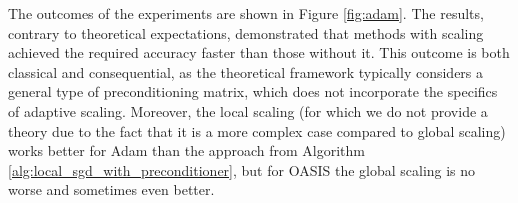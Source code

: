 \documentclass[sn-mathphys,Numbered]{sn-jnl}%
\renewcommand{\|}{\parallel}
\renewcommand {\*} {\ast}
\begin{document}






 


The outcomes of the experiments are shown in Figure \ref{fig:adam}. The results, contrary to theoretical expectations, demonstrated that methods with scaling achieved the required accuracy faster than those without it.
This outcome is both classical and consequential, as the theoretical framework typically considers a general type of preconditioning matrix, which does not incorporate the specifics of adaptive scaling. Moreover, the local scaling (for which we do not provide a theory due to the fact that it is a more complex case compared to global scaling) works better for Adam than the approach from Algorithm \ref{alg:local_sgd_with_preconditioner}, but for OASIS the global scaling is no worse and sometimes even better.
\end{document}
